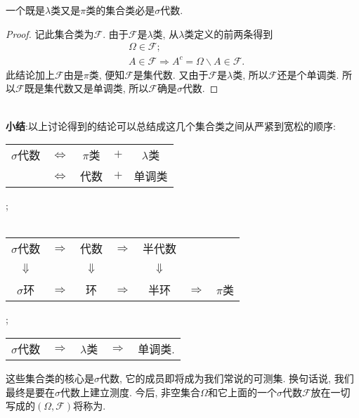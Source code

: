 \begin{theorem}
	一个既是$\lambda$类又是$\pi$类的集合类必是$\sigma$代数.
\end{theorem}
\begin{proof}
	记此集合类为$\mathscr{F}$. 由于$\mathscr{F}$是$\lambda$类, 从$\lambda$类定义的前两条得到
	\begin{align}
	&\Omega\in\mathscr{F};\nonumber\\
	&A\in\mathscr{F}\Rightarrow A^c = \Omega\backslash A\in\mathscr{F}.
	\end{align}
	此结论加上$\mathscr{F}$由是$\pi$类, 便知$\mathscr{F}$是集代数. 又由于$\mathscr{F}$是$\lambda$类, 所以$\mathscr{F}$还是个单调类. 所以$\mathscr{F}$既是集代数又是单调类, 所以$\mathscr{F}$确是$\sigma$代数.
\end{proof}\\
\textbf{小结}:以上讨论得到的结论可以总结成这几个集合类之间从严紧到宽松的顺序:

\begin{center}
	\begin{tabular}{ccccc}
		$\sigma$代数 & $\Longleftrightarrow$ & $\pi$类 & $+$ & $\lambda$类 \\
		~  & $\Longleftrightarrow$ & 代数 & $+$ & 单调类
	\end{tabular};
	\\ \hspace*{\fill} \\%
	\begin{tabular}{ccccccc}
		$\sigma$代数 & $\Longrightarrow$ & 代数 & $\Longrightarrow$ & 半代数 & ~ & ~ \\
		$\Downarrow$ & ~ & $\Downarrow$ & ~ & $\Downarrow$ & ~ & ~ \\
		$\sigma$环 & $\Longrightarrow$ & 环 & $\Longrightarrow$ & 半环 & $\Longrightarrow$ & $\pi$类
	\end{tabular};
	\begin{tabular}{ccccc}
		$\sigma$代数 & $\Rightarrow$ & $\lambda$类 & $\Rightarrow$ & 单调类.
	\end{tabular}
\end{center}

这些集合类的核心是$\sigma$代数, 它的成员即将成为我们常说的可测集. 换句话说, 我们最终是要在$\sigma$代数上建立测度. 今后, 非空集合$\Omega$和它上面的一个$\sigma$代数$\mathscr{F}$放在一切写成的$(\Omega,\mathscr{F})$将称为.

